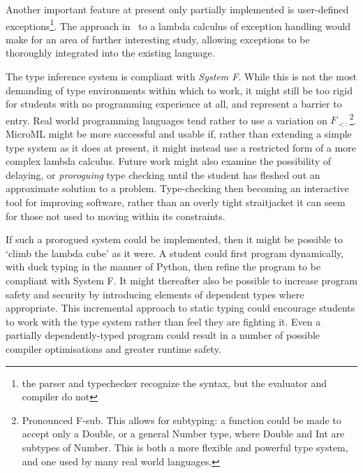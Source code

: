 \documentclass[12pt, a4paper]{report}
\begin{document}
Another important feature at present only partially implemented is user-defined
exceptions\footnote{the parser and typechecker recognize the syntax, but the evaluator and compiler
do not}. The approach in~\cite{deGroote1995} to a lambda calculus of exception handling would make
for an area of further interesting study, allowing exceptions to be thoroughly integrated into the
existing language.

The type inference system is compliant with \textit{System F}. While this is not the most demanding
of type environments within which to work, it might still be too rigid for students with no
programming experience at all, and represent a barrier to entry. Real world programming languages
tend rather to use a variation on $F_{<:}$\footnote{Pronounced F-sub. This allows for subtyping:
a function could be made to accept only a Double, or a general Number type, where Double and
Int are subtypes of Number. This is both a more flexible and powerful type system, and one used
by many real world languages.}. MicroML might be more successful and usable if, rather than
extending a simple type system as it does at present, it might instead use a restricted form of
a more complex lambda calculus. Future work might also examine the possibility of delaying, or
\textit{proroguing} type checking until the student has fleshed out an approximate solution to a
problem\cite{Afshari:2012:LPP:2384592.2384595}. Type-checking then becoming an interactive tool
for improving software, rather than an overly tight straitjacket it can seem for those not used to
moving within its constraints.

If such a prorogued system could be implemented, then it might be possible to `climb the lambda
cube' as it were. A student could first program dynamically, with duck typing in the manner of
Python, then refine the program to be compliant with System F. It might thereafter also be possible
to increase program safety and security by introducing elements of dependent types where
appropriate. This incremental approach to static typing could encourage students to work with the
type system rather than feel they are fighting it. Even a partially dependently-typed program could
result in a number of possible compiler optimisations and greater runtime safety.
\end{document}
